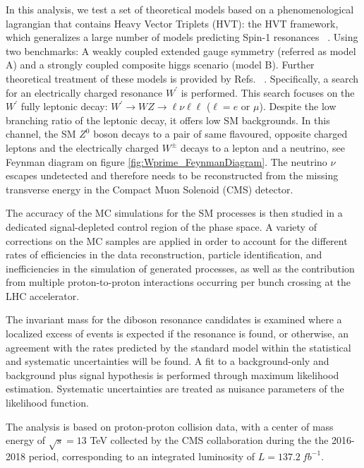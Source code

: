 In this analysis, we test a set of theoretical models based on a phenomenological
lagrangian that contains Heavy Vector Triplets (HVT): the HVT framework, which
generalizes a large number of models predicting Spin-1 resonances ~\cite{hvt2014}.
Using two benchmarks: A weakly coupled extended gauge symmetry (referred as model A) and a
strongly coupled composite higgs scenario (model B). Further theoretical treatment of these models
is provided by Refs. ~\cite{hvt2014,modelA1980,modelB2011}. Specifically, a search
for an electrically charged resonance $W^{\prime}$ is performed. This search focuses
on the $W^{\prime}$ fully leptonic decay:
$W^{\prime}\rightarrow WZ \rightarrow \ell\nu \ell\ell$ ($\ell = e$ or $\mu$).
Despite the low branching ratio of the leptonic decay, it offers low SM backgrounds.
In this channel, the SM $Z^{0}$
boson decays to a pair of same flavoured, opposite charged leptons and the
electrically charged $W^{\pm}$ decays to a lepton and a neutrino, see Feynman diagram
on figure \ref{fig:Wprime_FeynmanDiagram}. The neutrino $\nu$ escapes
undetected and therefore needs to be reconstructed from the missing transverse
energy in the Compact Muon Solenoid (CMS) detector.

The accuracy of the MC simulations for the SM processes is then studied in a
dedicated signal-depleted control region of the phase space. A variety of
corrections on the MC samples are applied in order to account for the different
rates of efficiencies in the data reconstruction, particle identification, and
inefficiencies in the simulation of generated processes, as well as the
contribution from multiple proton-to-proton interactions occurring per bunch
crossing at the LHC accelerator.

The invariant mass for the diboson resonance candidates is
examined where a localized excess of events is expected if the resonance is
found, or otherwise, an agreement with the rates predicted by the standard model
within the statistical and systematic uncertainties will be found.
A fit to a background-only and background plus signal hypothesis is performed
through maximum likelihood estimation. Systematic uncertainties are
treated as nuisance parameters of the likelihood function.

The analysis is based on proton-proton collision data, with a center of mass
energy of $\sqrt{s}=13$ TeV collected by the CMS collaboration during the the
2016-2018 period, corresponding to an integrated luminosity of $L=137.2~fb^{-1}$.
